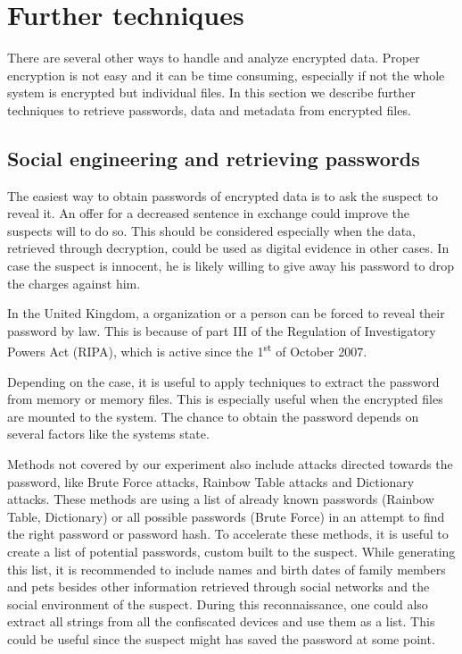 \section{Further techniques}
There are several other ways to handle and analyze encrypted data. 
Proper encryption is not easy and it can be time consuming, especially if not the whole system is encrypted but individual files. 
In this section we describe further techniques to retrieve passwords, data and metadata from encrypted files.
\subsection{Social engineering and retrieving passwords}
The easiest way to obtain passwords of encrypted data is to ask the suspect to reveal it.
An offer for a decreased sentence in exchange could improve the suspects will to do so.
This should be considered especially when the data, retrieved through decryption, could be used as digital evidence in other cases.
In case the suspect is innocent, he is likely willing to give away his password to drop the charges against him.

In the United Kingdom, a organization or a person can be forced to reveal their password by law. 
This is because of part III of the Regulation of Investigatory Powers Act (RIPA), which is active since the 1\textsuperscript{st} of October 2007.\cite{lowman2010effect}

Depending on the case, it is useful to apply techniques to extract the password from memory or  memory files. 
This is especially useful when the encrypted files are mounted to the system. 
The chance to obtain the password depends on several factors like the systems state.\cite{MaartmannMoe2009S132}

Methods not covered by our experiment also include attacks directed towards the password, like Brute Force attacks, Rainbow Table attacks and Dictionary attacks. 
These methods are using a list of already known passwords (Rainbow Table, Dictionary) or all possible passwords (Brute Force) in an attempt to find the right password or password hash.
To accelerate these methods, it is useful to create a list of potential passwords, custom built to the suspect. 
While generating this list, it is recommended to include names and birth dates of family members and pets besides other information retrieved through social networks and the social environment of the suspect. 
During this reconnaissance, one could also extract all strings from all the confiscated devices and use them as a list. 
This could be useful since the suspect might has saved the password at some point. 

